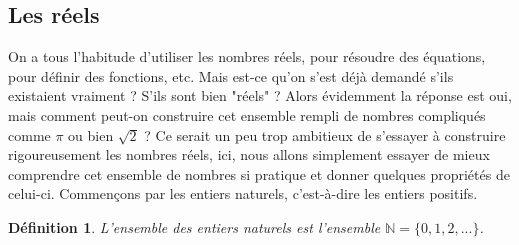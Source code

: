 \documentclass[a4paper, 12pt, french, twoside]{article}
\newtheorem{defi}[theorem]{Définition}
\newcommand{\Nn}{{\mathbb{N}}}
\begin{document}
\subsection{Les réels}
On a tous l'habitude d'utiliser les nombres réels, pour résoudre des équations, pour définir des fonctions, etc. Mais est-ce qu'on s'est déjà demandé s'ils existaient vraiment ? S'ils sont bien "réels" ? Alors évidemment la réponse est oui, mais comment peut-on construire cet ensemble rempli de nombres compliqués comme $\pi$ ou bien $\sqrt{2}$ ? Ce serait un peu trop ambitieux de s'essayer à construire rigoureusement les nombres réels, ici, nous allons simplement essayer de mieux comprendre cet ensemble de nombres si pratique et donner quelques propriétés de celui-ci. Commençons par les entiers naturels, c'est-à-dire les entiers positifs. 
\begin{defi} L'ensemble des entiers naturels est l'ensemble $\Nn=\{0,1,2,...\}$. 
\end{defi}
\end{document}
